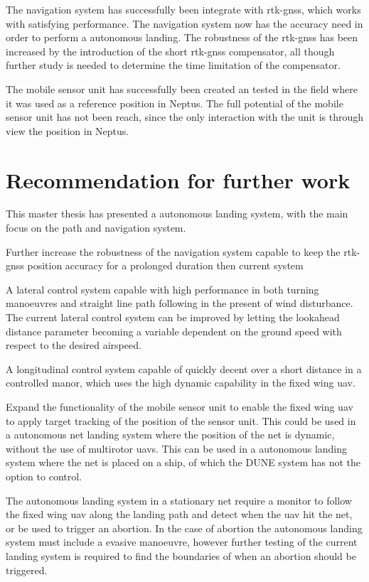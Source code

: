 The navigation system has successfully been integrate with \gls{rtk-gnss}, which works with satisfying performance. The navigation system now has the accuracy need in order to perform a autonomous landing. The robustness of the \gls{rtk-gnss} has been increased by the introduction of the short \gls{rtk-gnss} compensator, all though further study is needed to determine the time limitation of the compensator.

The mobile sensor unit has successfully been created an tested in the field where it was used as a reference position in Neptus. The full potential of the mobile sensor unit has not been reach, since the only interaction with the unit is through view the position in Neptus.
\section{Recommendation for further work}
This master thesis has presented a autonomous landing system, with the main focus on the path and navigation system.

Further increase the robustness of the navigation system capable to keep the \gls{rtk-gnss} position accuracy for a prolonged duration then current system

A lateral control system capable with high performance in both turning manoeuvres and straight line path following in the present of wind disturbance. The current lateral control system can be improved by letting the lookahead distance parameter becoming a variable dependent on the ground speed with respect to the desired airspeed.

A longitudinal control system capable of quickly decent over a short distance in a controlled manor, which uses the high dynamic capability in the fixed wing \gls{uav}.

Expand the functionality of the mobile sensor unit to enable the fixed wing \gls{uav} to apply target tracking of the position of the sensor unit. This could be used in a autonomous net landing system where the position of the net is dynamic, without the use of multirotor \glspl{uav}. This can be used in a autonomous landing system where the net is placed on a ship, of which the DUNE system has not the option to control.

The autonomous landing system in a stationary net require a monitor to follow the fixed wing \gls{uav} along the landing path and detect when the \gls{uav} hit the net, or be used to trigger an abortion. In the case of abortion the autonomous landing system must include a evasive manoeuvre, however further testing of the current landing system is required to find the boundaries of when an abortion should be triggered.